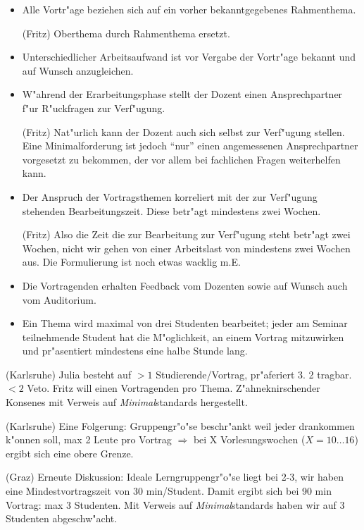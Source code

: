 \begin{itemize}
	\item Alle Vortr"age beziehen sich auf ein vorher bekanntgegebenes Rahmenthema.
	\begin{kcmt}\begin{komacmt}
		(Fritz) Oberthema durch Rahmenthema ersetzt.
	\end{komacmt}\end{kcmt}
	\item Unterschiedlicher Arbeitsaufwand ist vor Vergabe der Vortr"age bekannt und auf Wunsch anzugleichen.
	\item W"ahrend der Erarbeitungsphase stellt der Dozent einen Ansprechpartner f"ur R"uckfragen zur Verf"ugung.
	\begin{kcmt}\begin{komacmt}
		(Fritz) Nat"urlich kann der Dozent auch sich selbst zur Verf"ugung stellen. Eine Minimalforderung
		ist jedoch "`nur"' einen angemessenen Ansprechpartner vorgesetzt zu bekommen, der vor allem bei
		fachlichen Fragen weiterhelfen kann.
	\end{komacmt}\end{kcmt}
	\item Der Anspruch der Vortragsthemen korreliert mit der zur Verf"ugung stehenden Bearbeitungszeit. Diese
		betr"agt mindestens zwei Wochen.
	\begin{kcmt}\begin{komacmt}
		(Fritz) Also die Zeit die zur Bearbeitung zur Verf"ugung steht betr"agt zwei Wochen, nicht wir
		gehen von einer Arbeitslast von mindestens zwei Wochen aus. Die Formulierung ist noch etwas wacklig m.E.
	\end{komacmt}\end{kcmt}
	\item Die Vortragenden erhalten Feedback vom Dozenten sowie auf Wunsch auch vom Auditorium.
	\item Ein Thema wird maximal von drei Studenten bearbeitet; jeder am Seminar teilnehmende Student hat die M"oglichkeit, an einem Vortrag mitzuwirken und pr"asentiert mindestens eine halbe Stunde lang.
\end{itemize}


\begin{kcmt}\begin{komacmt}
	(Karlsruhe) Julia besteht auf $>1$ Studierende/Vortrag, pr"aferiert 3. 2 tragbar. $<2$ Veto. Fritz will einen Vortragenden pro Thema. Z"ahneknirschender Konsenes mit Verweis auf \emph{Minimal}standards hergestellt.

	(Karlsruhe) Eine Folgerung: Gruppengr"o"se beschr"ankt weil jeder drankommen k"onnen soll, max 2 Leute pro Vortrag $\Rightarrow$ bei X Vorlesungswochen ($X=10\ldots 16$) ergibt sich eine obere Grenze.
	
	(Graz) Erneute Diskussion: Ideale Lerngruppengr"o{"s}e liegt bei 2-3, wir haben eine Mindestvortragszeit von 30 min/Student. Damit ergibt sich bei 90 min Vortrag: max 3 Studenten. Mit Verweis auf \emph{Minimal}standards haben wir auf 3 Studenten abgeschw"acht.
\end{komacmt}\end{kcmt}


